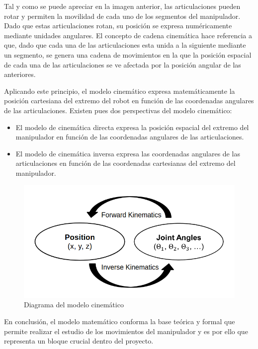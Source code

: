 Tal y como se puede apreciar en la imagen anterior, las articulaciones pueden rotar y permiten la movilidad de cada uno de los segmentos del manipulador. Dado que estas articulaciones rotan, su posición se expresa numéricamente mediante unidades angulares. El concepto de cadena cinemática hace referencia a que, dado que cada una de las articulaciones esta unida a la siguiente mediante un segmento, se genera una cadena de movimientos en la que la posición espacial de cada una de las articulaciones se ve afectada por la posición angular de las anteriores.

Aplicando este principio, el modelo cinemático expresa matemáticamente la posición cartesiana del extremo del robot en función de las coordenadas angulares de las articulaciones. Existen pues dos perspectivas del modelo cinemático:
\begin{itemize}
    \item El modelo de cinemática directa expresa la posición espacial del extremo del manipulador en función de las coordenadas angulares de las articulaciones.
    \item El modelo de cinemática inversa expresa las coordenadas angulares de las articulaciones en función de las coordenadas cartesianas del extremo del manipulador.
\end{itemize}

\begin{figure}[H]
    \centering 
    \includegraphics[width=.6\linewidth]{pictures/Kinematic Diagram.png}
    \caption{Diagrama del modelo cinemático}
    \label{fig:}
\end{figure}

En conclusión, el modelo matemático conforma la base teórica y formal que permite realizar el estudio de los movimientos del manipulador y es por ello que representa un bloque crucial dentro del proyecto.


